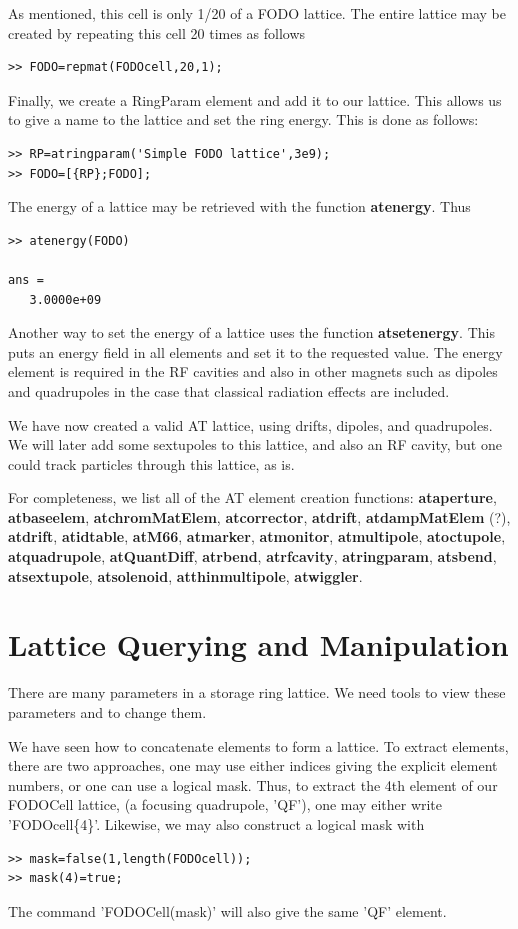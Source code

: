 \documentclass[acus]{article}
\newcommand{\mfun}[1]{{\bf{#1}}}
\begin{document}
As mentioned, this cell is only 1/20 of a FODO lattice. The entire lattice may be created by repeating this cell 20 times as
follows
\begin{verbatim}
>> FODO=repmat(FODOcell,20,1);
\end{verbatim}

Finally, we create a RingParam element and add it to our lattice.  This allows us to give a name to
the lattice and set the ring energy.  This is done as follows:
\begin{verbatim}
>> RP=atringparam('Simple FODO lattice',3e9);
>> FODO=[{RP};FODO];
\end{verbatim}

The energy of a lattice may be retrieved with the function \mfun{atenergy}.  Thus
\begin{verbatim}
>> atenergy(FODO)

ans =
   3.0000e+09
\end{verbatim}
Another way to set the energy of a lattice uses the function \mfun{atsetenergy}.  This puts an 
energy field in all elements and set it to the requested value.  The energy element is required
in the RF cavities and also in other magnets such as dipoles and quadrupoles in the case that
classical radiation effects are included.

We have now created a valid AT lattice, using drifts, dipoles, 
and quadrupoles.  We will later add some sextupoles to this lattice,
and also an RF cavity, but one could track particles through this lattice, as is.  

For completeness, we list all of the AT element creation functions:
\mfun{ataperture}, \mfun{atbaseelem}, \mfun{atchromMatElem}, \mfun{atcorrector},
\mfun{atdrift}, \mfun{atdampMatElem} (?), \mfun{atdrift}, \mfun{atidtable}, \mfun{atM66}, \mfun{atmarker}, \mfun{atmonitor},
\mfun{atmultipole}, \mfun{atoctupole}, \mfun{atquadrupole}, \mfun{atQuantDiff}, \mfun{atrbend},
\mfun{atrfcavity}, \mfun{atringparam}, \mfun{atsbend}, \mfun{atsextupole}, \mfun{atsolenoid},
\mfun{atthinmultipole}, \mfun{atwiggler}.

\section{Lattice Querying and Manipulation}\label{lattice_query_manip}
There are many parameters in a storage ring lattice.  We need tools to view these parameters and 
to change them.  

We have seen how to concatenate elements to form a lattice.  To extract elements, there are two
approaches, one may use either indices giving the explicit element numbers, or one can use a logical 
mask. Thus, to extract the 4th element of our FODOCell lattice, (a focusing quadrupole, 'QF'), one may
either write 'FODOcell\{4\}'. Likewise, we may also construct a logical mask with
\begin{verbatim}
>> mask=false(1,length(FODOcell));
>> mask(4)=true;
\end{verbatim}
The command 'FODOCell(mask)' will also give the same 'QF' element.
\end{document}
